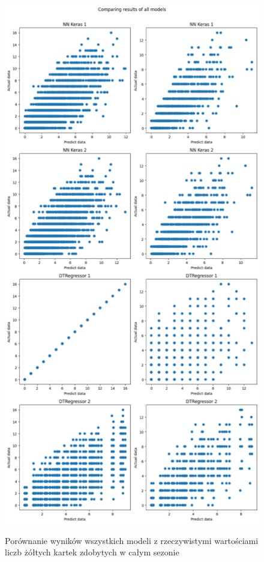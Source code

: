 \documentclass{article}
\begin{document}
\begin{figure}[H]
\begin{minipage}[b]{0.5\textwidth}
    \label{fig:obraz3}
  \end{minipage}%
  \begin{minipage}[b]{0.5\textwidth}
    \centering
    \includegraphics[width=\textwidth]{all_models_4.png}
    \label{fig:obraz4}
  \end{minipage}
  \captionsetup{justification=centering}
  \caption{Porównanie wyników wszystkich modeli z rzeczywistymi wartościami liczb żółtych kartek zdobytych w całym sezonie}
  \label{fig:all_models2}
\end{figure}
\end{document}
